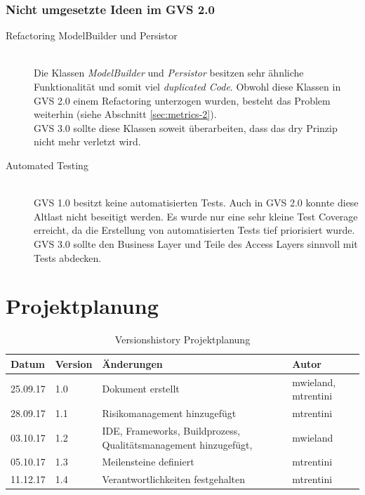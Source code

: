 \documentclass[11pt,a4paper,english,oneside]{book}
\numberwithin{equation}{chapter}
\begin{document}
	\subsection{Nicht umgesetzte Ideen im GVS 2.0}
	\label{ssec:gvs-todos}
	\begin{description}
		\item[Refactoring ModelBuilder und Persistor] \hfill \\
			Die Klassen \textit{ModelBuilder} und \textit{Persistor} besitzen sehr ähnliche Funktionalität und somit viel \textit{duplicated Code}. Obwohl diese Klassen in GVS 2.0 einem Refactoring unterzogen wurden, besteht das Problem weiterhin (siehe Abschnitt \ref{sec:metrics-2}).\\
			GVS 3.0 sollte diese Klassen soweit überarbeiten, dass das \gls{dry} Prinzip nicht mehr verletzt wird.
		\item[Automated Testing] \hfill \\
			GVS 1.0 besitzt keine automatisierten Tests. Auch in GVS 2.0 konnte diese Altlast nicht beseitigt werden. Es wurde nur eine sehr kleine Test Coverage erreicht, da die Erstellung von automatisierten Tests tief priorisiert wurde.\\
			GVS 3.0 sollte den Business Layer und Teile des Access Layers sinnvoll mit Tests abdecken.
	\end{description}
	
	
	\newpage
	
	\appendix
	\noappendicestocpagenum
	\addappheadtotoc
	\appendixpage
	
	\chapter{Projektplanung}
	
	\begin{table}[h!]
		\centering
		\begin{tabularx}{\linewidth}{l l X l}
			\toprule 
			Datum & Version & Änderungen & Autor \\
			\midrule
			25.09.17 & 1.0 & Dokument erstellt & mwieland, mtrentini \\
			28.09.17 & 1.1 & Risikomanagement hinzugefügt & mtrentini \\
			03.10.17 & 1.2 & IDE, Frameworks, Buildprozess, Qualitätsmanagement hinzugefügt, & mwieland \\
			05.10.17 & 1.3 & Meilensteine definiert & mtrentini \\
			11.12.17 & 1.4 & Verantwortlichkeiten festgehalten & mtrentini \\
			\bottomrule 
		\end{tabularx} 
		\caption{Versionshistory Projektplanung} 
	\end{table}
	
\end{document}
